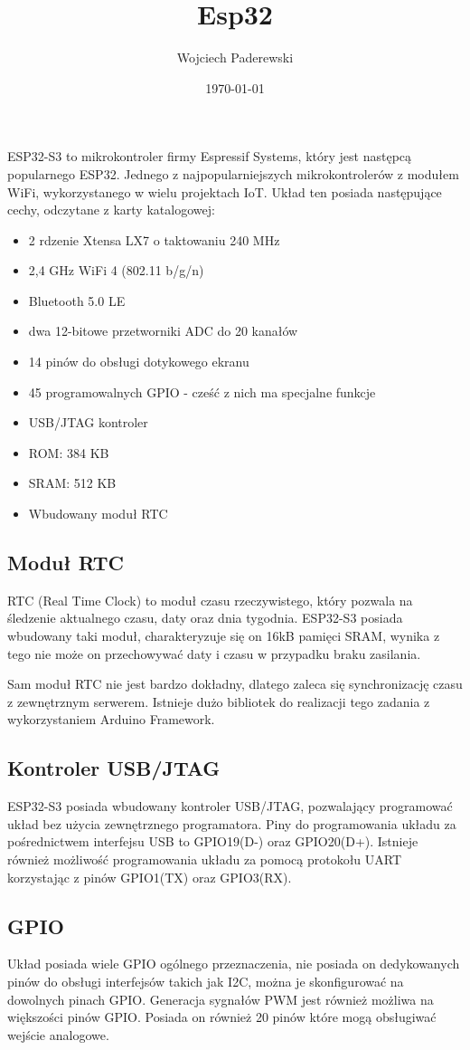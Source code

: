 \documentclass[../main.tex]{subfiles}
\author{Wojciech Paderewski}
\date{\today}
\title{Esp32}
\begin{document}
ESP32-S3 to mikrokontroler firmy Espressif Systems, który jest następcą popularnego ESP32.
Jednego z najpopularniejszych mikrokontrolerów z modułem WiFi, wykorzystanego w wielu projektach IoT\cite{st:esp32-book}.
Układ ten posiada następujące cechy, odczytane z karty katalogowej\cite{st:esp32}:

\begin{itemize}
\item 2 rdzenie Xtensa LX7 o taktowaniu 240 MHz
\item 2,4 GHz WiFi 4 (802.11 b/g/n)
\item Bluetooth 5.0 LE
\item dwa 12-bitowe przetworniki ADC do 20 kanałów
\item 14 pinów do obsługi dotykowego ekranu
\item 45 programowalnych GPIO - cześć z nich ma specjalne funkcje
\item USB/JTAG kontroler
\item ROM: 384 KB
\item SRAM: 512 KB
\item Wbudowany moduł RTC
\end{itemize}
\subsection{Moduł RTC}

RTC (Real Time Clock) to moduł czasu rzeczywistego, który pozwala na śledzenie aktualnego czasu, daty oraz dnia tygodnia. 
ESP32-S3 posiada wbudowany taki moduł, charakteryzuje się on 16kB pamięci SRAM, wynika z tego nie może on przechowywać daty i czasu w przypadku braku zasilania.

Sam moduł RTC nie jest bardzo dokładny, dlatego zaleca się synchronizację czasu z zewnętrznym serwerem.
Istnieje dużo bibliotek do realizacji tego zadania z wykorzystaniem Arduino Framework.

\subsection{Kontroler USB/JTAG}
ESP32-S3 posiada wbudowany kontroler USB/JTAG, pozwalający programować układ bez użycia zewnętrznego programatora.
Piny do programowania układu za pośrednictwem interfejsu USB to GPIO19(D-) oraz GPIO20(D+).
Istnieje również możliwość programowania układu za pomocą protokołu UART korzystając z pinów GPIO1(TX) oraz GPIO3(RX).

\subsection{GPIO}
Układ posiada wiele GPIO ogólnego przeznaczenia, nie posiada on dedykowanych pinów do obsługi interfejsów takich jak I2C, można 
je skonfigurować na dowolnych pinach GPIO. Generacja sygnałów PWM jest również możliwa na większości pinów GPIO. Posiada on również 20 pinów które mogą
obsługiwać wejście analogowe.
\end{document}

